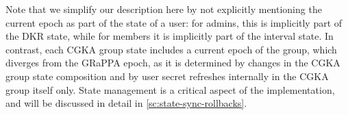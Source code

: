 Note that we simplify our description here by not explicitly mentioning the current epoch as part of the state of a user:
for admins, this is implicitly part of the DKR state, while for members it is implicitly part of the interval state.
In contrast, each CGKA group state includes a current epoch of the group,
which diverges from the GRaPPA epoch, as it is determined by changes in
the CGKA group state composition and by user secret refreshes internally in the
CGKA group itself only. State management is a critical aspect 
of the implementation, and will be discussed in detail in \cref{sc:state-sync-rollbacks}.

